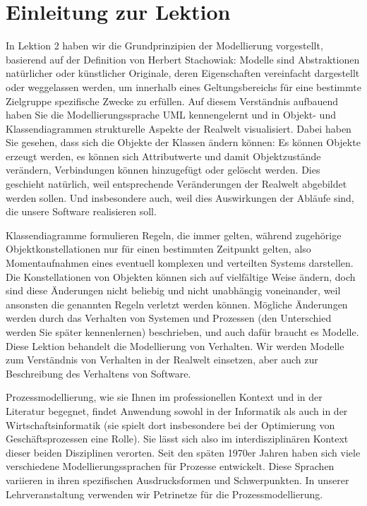 \cleardoublepage
\chapter*{Einleitung zur Lektion}

In Lektion 2 haben wir die Grundprinzipien der Modellierung vorgestellt,  
basierend auf der Definition von Herbert Stachowiak: Modelle sind Abstraktionen natürlicher oder künstlicher Originale, deren Eigenschaften vereinfacht dargestellt oder weggelassen werden, um innerhalb eines Geltungsbereichs für eine bestimmte Zielgruppe spezifische Zwecke zu erfüllen. Auf diesem Verständnis aufbauend haben Sie die Modellierungssprache UML kennengelernt und in Objekt- und Klassendiagrammen strukturelle Aspekte der Realwelt visualisiert. Dabei haben Sie gesehen, dass sich die Objekte der Klassen ändern können: Es können Objekte erzeugt werden, es können sich Attributwerte und damit Objektzustände verändern, Verbindungen können hinzugefügt oder gelöscht werden. Dies geschieht natürlich, weil entsprechende Veränderungen der Realwelt abgebildet werden sollen. Und insbesondere auch, weil dies Auswirkungen der Abläufe sind, die unsere Software realisieren soll.

Klassendiagramme formulieren Regeln, die immer gelten, 
während zugehörige Objektkonstellationen nur für einen bestimmten Zeitpunkt gelten, also Momentaufnahmen eines eventuell komplexen und verteilten Systems darstellen. Die Konstellationen von Objekten können sich auf vielfältige Weise ändern, doch sind diese Änderungen nicht beliebig und nicht unabhängig voneinander, weil ansonsten die genannten Regeln verletzt werden können. Mögliche Änderungen werden durch das Verhalten von Systemen und Prozessen (den Unterschied werden Sie später kennenlernen) beschrieben, und auch dafür braucht es Modelle. Diese Lektion behandelt die Modellierung von Verhalten. Wir werden Modelle zum Verständnis von Verhalten in der Realwelt einsetzen, aber auch zur Beschreibung des Verhaltens von Software.

Prozessmodellierung, 
wie sie Ihnen im professionellen Kontext und in der Literatur begegnet, findet Anwendung sowohl in der Informatik als auch in der Wirt\-schafts\-infor\-matik (sie spielt dort insbesondere bei der Optimierung von Geschäftsprozessen eine Rolle). Sie lässt sich also im interdisziplinären Kontext dieser beiden Disziplinen verorten. Seit den späten 1970er Jahren haben sich viele verschiedene Modellierungssprachen für Prozesse entwickelt. Diese Sprachen variieren in ihren spezifischen Ausdrucksformen und Schwerpunkten. In unserer Lehrveranstaltung verwenden wir Petrinetze für die Prozessmodellierung.

